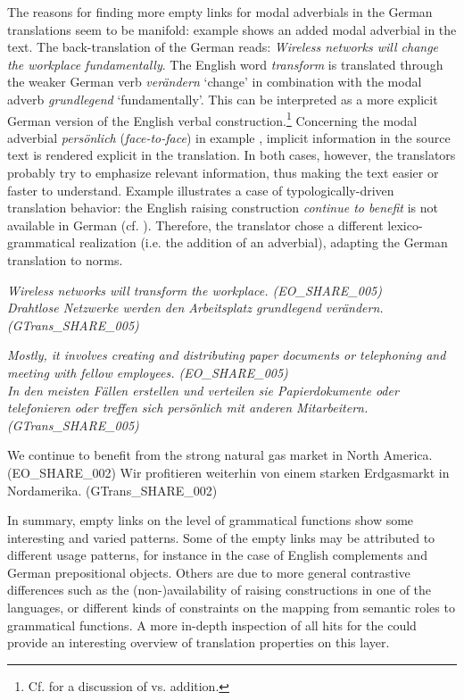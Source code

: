 \documentclass[output=paper]{LSP/langsci}
\begin{document}
The reasons for finding more empty links for modal adverbials in the German translations seem to be manifold: example  shows an added modal adverbial in the  text. The back-translation of the German  reads: \textit{Wireless networks will change the workplace fundamentally}. The English word \textit{transform} is translated through the weaker German verb \textit{verändern} `change' in combination with the modal adverb \textit{grundlegend} `fundamentally'. This can be interpreted as a more explicit German version of the English verbal construction.\footnote{Cf. \citet{Hansen-SchirraEtAl2007} for a discussion of  vs. addition.} Concerning the modal adverbial \textit{persönlich} (\textit{face-to-face}) in example , implicit information in the source text is rendered explicit in the translation. In both cases, however, the translators probably try to emphasize relevant information, thus making the text easier or faster to understand. Example  illustrates a case of typologically-driven translation behavior: the English raising construction \textit{continue to benefit} is not available in German (cf. \citealt[75ff]{Hawkins1986}). Therefore, the translator chose a different lexico-grammatical realization (i.e. the addition of an adverbial), adapting the German translation to  norms.


\ea \label{ex:culo:9}
   \ea  \textit{Wireless networks will transform the workplace. \textup{(EO\_SHARE\_005)}}\\
   \ex \textit{Drahtlose Netzwerke werden den Arbeitsplatz grundlegend verändern. \textup{(GTrans\_SHARE\_005)}}
    \z
\z 


\ea \label{ex:culo:10} 
   \ea \textit{Mostly, it involves creating and distributing paper documents or telephoning and meeting with fellow employees. \textup{(EO\_SHARE\_005)}}\\
  \ex \textit{In den meisten Fällen erstellen und verteilen sie Papierdokumente oder telefonieren   oder treffen sich persönlich mit anderen Mitarbeitern. \textup{(GTrans\_SHARE\_005)}}
  \z
\z


\ea \label{ex:culo:11}
   \ea
 We continue to benefit from the strong natural gas market in North America. \textup{(EO\_SHARE\_002)}
   \ex 
   Wir profitieren weiterhin von einem starken Erdgasmarkt in Nordamerika. \textup{(GTrans\_SHARE\_002)}
   \z
\z


In summary, empty links on the level of grammatical functions show some interesting and varied patterns. Some of the empty links may be attributed to different usage patterns, for instance in the case of English complements and German prepositional objects. Others are due to more general contrastive differences such as the (non-)availability of raising constructions in one of the languages, or different kinds of constraints on the mapping from semantic roles to grammatical functions. A more in-depth inspection of all hits for the  could provide an interesting overview of translation properties on this layer.
\end{document}
